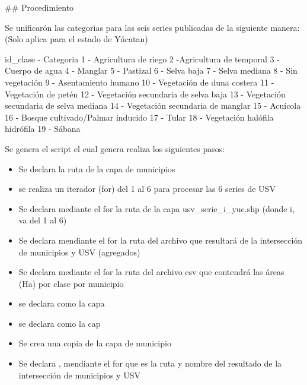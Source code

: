 \documentclass[letterpaper,10pt,spanish]{sphinxmanual}
\begin{document}
\#\# Procedimiento

Se unificarón las categorias para las seis series publicadas de la siguiente manera:
(Solo aplica para el estado de Yúcatan)

id\_clase - Categoria
1 - Agricultura de riego
2 -Agricultura de temporal
3 - Cuerpo de agua
4 - Manglar
5 - Pastizal
6 - Selva baja
7 - Selva mediana
8 - Sin vegetación
9 - Asentamiento humano
10 - Vegetación de duna costera
11 - Vegetación de petén
12 - Vegetación secundaria de selva baja
13 - Vegetación secundaria de selva mediana
14 - Vegetación secundaria de manglar
15 - Acuícola
16 - Bosque cultivado/Palmar inducido
17 - Tular
18 - Vegetación halófila hidrófila
19 - Sábana

Se genera el script  el cual genera
realiza los siguientes pasos:
\begin{itemize}
\item {} 
Se declara  la ruta de la capa de municipios

\item {} 
se realiza un iterador (for) del 1 al 6 para procesar las 6 series de USV

\item {} 
Se declara  mediante el for la ruta de la capa usv\_serie\_i\_yuc.shp (donde i, va del 1 al 6)

\item {} 
Se declara   mendiante el for la ruta del archivo que resultará de la intersección de municipios y USV  (agregados)

\item {} 
Se declara  mediante el for la ruta del archivo csv que contendrá las áreas (Ha) por clase por municipio

\item {} 
se declara  como la capa 

\item {} 
se declara  como la cap 

\item {} 
Se crea una copia de la capa de municipio

\item {} 
Se declara , mendiante el for que  es la ruta y nombre del resultado de la intersección de municipios y USV


\end{itemize}
\end{document}
